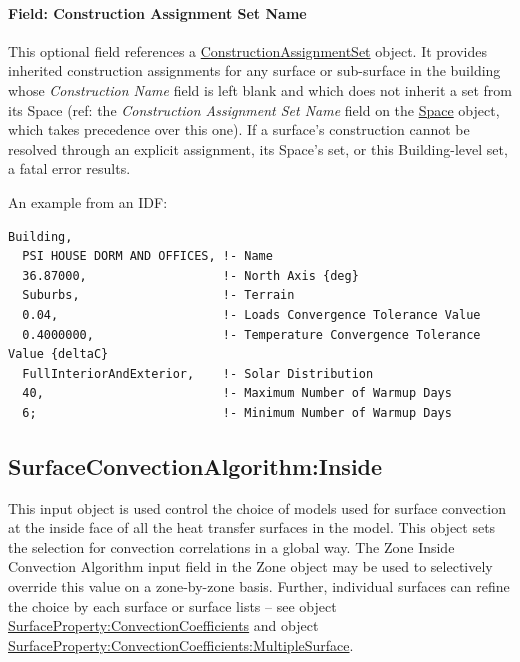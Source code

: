 \paragraph{Field: Construction Assignment Set Name}\label{building-field-construction-assignment-set-name}

This optional field references a \hyperref[constructionassignmentset]{ConstructionAssignmentSet} object. It provides inherited construction assignments for any surface or sub-surface in the building whose \emph{Construction Name} field is left blank and which does not inherit a set from its Space (ref: the \emph{Construction Assignment Set Name} field on the \hyperref[space]{Space} object, which takes precedence over this one). If a surface's construction cannot be resolved through an explicit assignment, its Space's set, or this Building-level set, a fatal error results.

An example from an IDF:

\begin{lstlisting}
Building,
  PSI HOUSE DORM AND OFFICES, !- Name
  36.87000,                   !- North Axis {deg}
  Suburbs,                    !- Terrain
  0.04,                       !- Loads Convergence Tolerance Value
  0.4000000,                  !- Temperature Convergence Tolerance Value {deltaC}
  FullInteriorAndExterior,    !- Solar Distribution
  40,                         !- Maximum Number of Warmup Days
  6;                          !- Minimum Number of Warmup Days
\end{lstlisting}

\subsection{SurfaceConvectionAlgorithm:Inside}\label{surfaceconvectionalgorithminside}

This input object is used control the choice of models used for surface convection at the inside face of all the heat transfer surfaces in the model. This object sets the selection for convection correlations in a global way. The Zone Inside Convection Algorithm input field in the Zone object may be used to selectively override this value on a zone-by-zone basis. Further, individual surfaces can refine the choice by each surface or surface lists -- see object \hyperref[surfacepropertyconvectioncoefficients]{SurfaceProperty:ConvectionCoefficients} and object \hyperref[surfacepropertyconvectioncoefficientsmultiplesurface]{SurfaceProperty:ConvectionCoefficients:MultipleSurface}.

